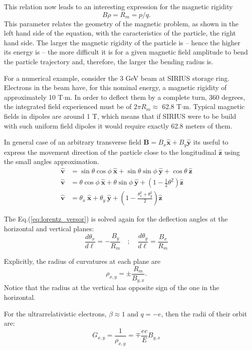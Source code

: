 This relation now leads to an interesting expression for the magnetic rigidity
\begin{equation}
\label{eq:rigidity}
    B\rho = {R_m} = p/q.
\end{equation}
This parameter relates the geometry of the magnetic problem, as shown in the left hand side of the equation, with the caracteristics of the particle, the right hand side. The larger the magnetic rigidity of the particle is -- hence the higher its energy is -- the more difficult it is for a given magnetic field amplitude to bend the particle trajectory and, therefore, the larger the bending radius is.

For a numerical example, consider the 3 GeV beam at SIRIUS storage ring. Electrons in the beam have, for this nominal energy, a magnetic rigidity of approximately 10 T$\cdot$m. In order to deflect them by a complete turn, 360 degrees, the integrated field experienced must be of $2\pi R_m \approx$ 62.8 T$\cdot$m. Typical magnetic fields in dipoles are around 1 T, which means that if SIRIUS were to be build with such uniform field dipoles it would require exactly 62.8 meters of them.

In general case of an arbitrary transverse field $\bm{B}=B_x\bm{\hat{x}}+B_y\bm{\hat{y}}$ its useful to express the movement direction of the particle close to the longitudinal $\bm{\hat{z}}$ using the small angles approximation.
\begin{align}
    \bm{\hat{v}} &= \sin{\theta}\cos{\phi} ~ \bm{\hat{x}} + \sin{\theta}\sin{\phi} ~ \bm{\hat{y}} + \cos{\theta} ~ \bm{\hat{z}} \nonumber \\
    \bm{\hat{v}} &= \theta\cos{\phi} ~ \bm{\hat{x}} + \theta\sin{\phi} ~ \bm{\hat{y}} + \left(1-\frac{1}{2}\theta^2\right)\bm{\hat{z}} \nonumber \\
    \bm{\hat{v}} &= \theta_x ~ \bm{\hat{x}} + \theta_y ~ \bm{\hat{y}} + \left(1-\frac{\theta_x^2+\theta_y^2}{2}\right)\bm{\hat{z}}
\end{align}

The Eq.(\ref{eq:lorentz_versor}) is solved again for the deflection angles at the horizontal and vertical planes:
\begin{equation}
    \frac{d\theta_x}{d\ell}  = - \frac{B_y}{R_m} \quad ; \quad \frac{d\theta_y}{d\ell}  = \frac{B_x}{R_m}
\end{equation}

Explicitly, the radius of curvatures at each plane are
\begin{equation}
    \rho_{x,y}=\pm \frac{R_m}{B_{y,x}}.
\end{equation}
Notice that the radius at the vertical has opposite sign of the one in the horizontal.

For the ultrarrelativistic electrons, $\beta\approx 1$ and $q=-e$, then the radii of their orbit are:
\begin{equation}
    G_{x,y} = \frac{1}{\rho_{x,y}} = \mp \frac{ec}{E}B_{y,x}
\end{equation}

